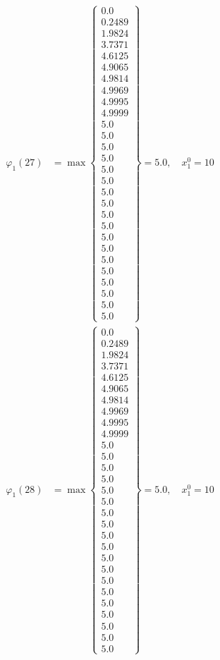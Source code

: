 \documentclass{article}
\begin{document}
\begin{align*}
\varphi_{1}(27) &= \max \left\{ \begin{array}{c}
0.0 \\
 0.2489 \\
 1.9824 \\
 3.7371 \\
 4.6125 \\
 4.9065 \\
 4.9814 \\
 4.9969 \\
 4.9995 \\
 4.9999 \\
 5.0 \\
 5.0 \\
 5.0 \\
 5.0 \\
 5.0 \\
 5.0 \\
 5.0 \\
 5.0 \\
 5.0 \\
 5.0 \\
 5.0 \\
 5.0 \\
 5.0 \\
 5.0 \\
 5.0 \\
 5.0 \\
 5.0 \\
 5.0
\end{array} \right\}=5.0, \quad x_{1}^0=10\\
  
\varphi_{1}(28) &= \max \left\{ \begin{array}{c}
0.0 \\
 0.2489 \\
 1.9824 \\
 3.7371 \\
 4.6125 \\
 4.9065 \\
 4.9814 \\
 4.9969 \\
 4.9995 \\
 4.9999 \\
 5.0 \\
 5.0 \\
 5.0 \\
 5.0 \\
 5.0 \\
 5.0 \\
 5.0 \\
 5.0 \\
 5.0 \\
 5.0 \\
 5.0 \\
 5.0 \\
 5.0 \\
 5.0 \\
 5.0 \\
 5.0 \\
 5.0 \\
 5.0 \\
 5.0
\end{array} \right\}=5.0, \quad x_{1}^0=10\\
  

\end{align*}
\end{document}

